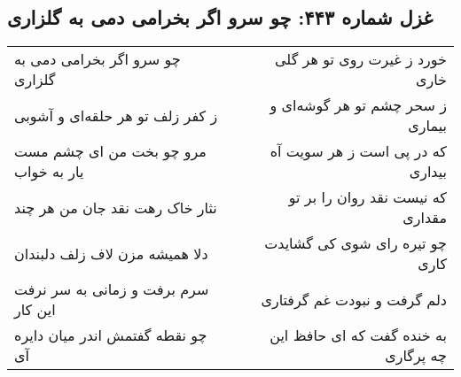 \begin{center}
\section*{غزل شماره ۴۴۳: چو سرو اگر بخرامی دمی به گلزاری}
\label{sec:sh443}
\begin{longtable}{l p{0.5cm} r}
چو سرو اگر بخرامی دمی به گلزاری
&&
خورد ز غیرت روی تو هر گلی خاری
\\
ز کفر زلف تو هر حلقه‌ای و آشوبی
&&
ز سحر چشم تو هر گوشه‌ای و بیماری
\\
مرو چو بخت من ای چشم مست یار به خواب
&&
که در پی است ز هر سویت آه بیداری
\\
نثار خاک رهت نقد جان من هر چند
&&
که نیست نقد روان را بر تو مقداری
\\
دلا همیشه مزن لاف زلف دلبندان
&&
چو تیره رای شوی کی گشایدت کاری
\\
سرم برفت و زمانی به سر نرفت این کار
&&
دلم گرفت و نبودت غم گرفتاری
\\
چو نقطه گفتمش اندر میان دایره آی
&&
به خنده گفت که ای حافظ این چه پرگاری
\\
\end{longtable}
\end{center}
